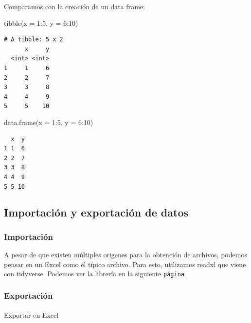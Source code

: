 \documentclass[
  letterpaper,
  DIV=11,
  numbers=noendperiod]{scrartcl}
\makeatletter
\let\oldparagraph\paragraph
\renewcommand{\paragraph}{
    \@ifstar
      \xxxParagraphStar
      \xxxParagraphNoStar
  }
\newcommand{\xxxParagraphStar}[1]{\oldparagraph*{#1}\mbox{}}
\newcommand{\xxxParagraphNoStar}[1]{\oldparagraph{#1}\mbox{}}
\newenvironment{Shaded}{\begin{snugshade}}{\end{snugshade}}
\newcommand{\AttributeTok}[1]{\textcolor[rgb]{0.40,0.45,0.13}{#1}}
\newcommand{\DecValTok}[1]{\textcolor[rgb]{0.68,0.00,0.00}{#1}}
\newcommand{\FunctionTok}[1]{\textcolor[rgb]{0.28,0.35,0.67}{#1}}
\newcommand{\NormalTok}[1]{\textcolor[rgb]{0.00,0.23,0.31}{#1}}
\newcommand{\SpecialCharTok}[1]{\textcolor[rgb]{0.37,0.37,0.37}{#1}}
\makeatother
\begin{document}
Comparamos con la creación de un data frame:

\begin{Shaded}
\begin{Highlighting}[]
\FunctionTok{tibble}\NormalTok{(}\AttributeTok{x =} \DecValTok{1}\SpecialCharTok{:}\DecValTok{5}\NormalTok{, }\AttributeTok{y =} \DecValTok{6}\SpecialCharTok{:}\DecValTok{10}\NormalTok{)}
\end{Highlighting}
\end{Shaded}

\begin{verbatim}
# A tibble: 5 x 2
      x     y
  <int> <int>
1     1     6
2     2     7
3     3     8
4     4     9
5     5    10
\end{verbatim}

\begin{Shaded}
\begin{Highlighting}[]
\FunctionTok{data.frame}\NormalTok{(}\AttributeTok{x =} \DecValTok{1}\SpecialCharTok{:}\DecValTok{5}\NormalTok{, }\AttributeTok{y =} \DecValTok{6}\SpecialCharTok{:}\DecValTok{10}\NormalTok{)}
\end{Highlighting}
\end{Shaded}

\begin{verbatim}
  x  y
1 1  6
2 2  7
3 3  8
4 4  9
5 5 10
\end{verbatim}

\subsection{Importación y exportación de
datos}\label{importaciuxf3n-y-exportaciuxf3n-de-datos}

\subsubsection{Importación}\label{importaciuxf3n}

A pesar de que existen múltiples origenes para la obtención de archivos,
podemos pensar en un Excel como el típico archivo. Para esto, utilizamos
readxl que viene con tidyverse. Podemos ver la librería en la siguiente
\href{https://readxl.tidyverse.org}{\texttt{página}}

\subsubsection{Exportación}\label{exportaciuxf3n}

\paragraph{Exportar en Excel}\label{exportar-en-excel}
\end{document}
